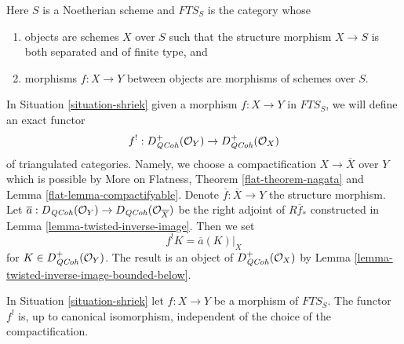 \begin{situation}
\label{situation-shriek}
Here $S$ is a Noetherian scheme and $\textit{FTS}_S$ is the category whose
\begin{enumerate}
\item objects are schemes $X$ over $S$ such that the structure
morphism $X \to S$ is both separated and of finite type, and
\item morphisms $f : X \to Y$ between objects are morphisms
of schemes over $S$.
\end{enumerate}
\end{situation}

\noindent
In Situation \ref{situation-shriek} given a morphism $f : X \to Y$
in $\textit{FTS}_S$, we will define an exact functor
$$
f^! : D_{\mathit{QCoh}}^+(\mathcal{O}_Y) \to D_{\mathit{QCoh}}^+(\mathcal{O}_X)
$$
of triangulated categories. Namely, we choose a compactification
$X \to \overline{X}$ over $Y$ which is possible by
More on Flatness, Theorem \ref{flat-theorem-nagata} and
Lemma \ref{flat-lemma-compactifyable}.
Denote $\overline{f} : \overline{X} \to Y$
the structure morphism. Let
$\overline{a} : D_{\mathit{QCoh}}(\mathcal{O}_Y) \to D_{\mathit{QCoh}}(\mathcal{O}_{\overline{X}})$
be the right adjoint of $R\overline{f}_*$
constructed in Lemma \ref{lemma-twisted-inverse-image}. Then we set
$$
f^!K  = \overline{a}(K)|_X
$$
for $K \in D_{\mathit{QCoh}}^+(\mathcal{O}_Y)$. The result is an object of
$D_{\mathit{QCoh}}^+(\mathcal{O}_X)$ by
Lemma \ref{lemma-twisted-inverse-image-bounded-below}.

\begin{lemma}
\label{lemma-shriek-well-defined}
In Situation \ref{situation-shriek} let $f : X \to Y$ be a morphism
of $\textit{FTS}_S$. The functor $f^!$ is, up to canonical isomorphism,
independent of the choice of the compactification.
\end{lemma}

